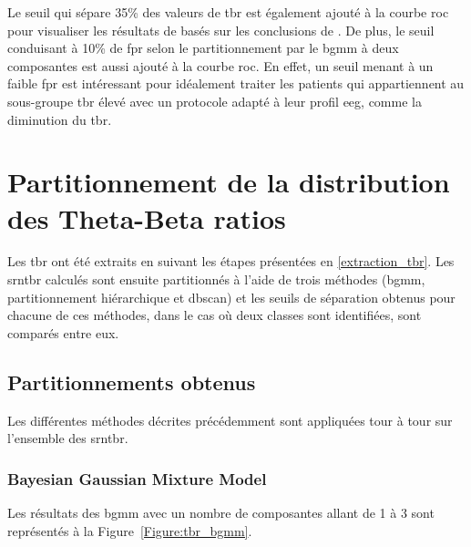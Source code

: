 Le seuil qui sépare 35\% des valeurs de 
\gls{tbr} est également ajouté à la courbe \gls{roc} pour visualiser les résultats de \citet{Zhang2017} basés sur les conclusions de \citet{Clarke2011}.
De plus, le seuil conduisant à 10\% de \gls{fpr} selon le partitionnement par le \gls{bgmm} à deux composantes est aussi ajouté à la courbe \gls{roc}. 
En effet, un seuil menant à un faible \gls{fpr} est intéressant pour idéalement traiter les patients qui appartiennent au sous-groupe \gls{tbr} élevé avec 
un protocole adapté à leur profil \gls{eeg}, comme la diminution du \gls{tbr}.

\section{Partitionnement de la distribution des Theta-Beta ratios}

Les \gls{tbr} ont été extraits en suivant les étapes présentées en \ref{extraction_tbr}. Les \gls{srntbr} calculés sont ensuite partitionnés à l'aide de trois
méthodes (\gls{bgmm}, partitionnement hiérarchique et \gls{dbscan}) et les seuils de séparation obtenus pour chacune de ces méthodes, dans le cas où deux classes sont 
identifiées, sont comparés entre eux.  

\subsection{Partitionnements obtenus}

Les différentes méthodes décrites précédemment sont appliquées tour à tour sur l'ensemble des \gls{srntbr}.

\subsubsection{Bayesian Gaussian Mixture Model}

Les résultats des \gls{bgmm} avec un nombre de composantes allant de 1 à 3 sont représentés à la Figure~\ref{Figure:tbr_bgmm}. 

